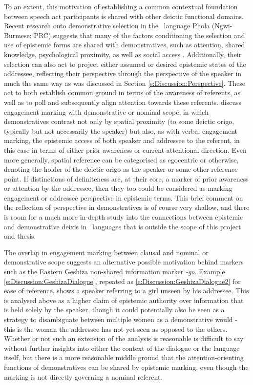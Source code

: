 To an extent, this motivation of establishing a common contextual foundation between speech act participants is shared with other deictic functional domains. Recent research onto demonstrative selection in the \lfam\ language Phola (Ngwi-Burmese: PRC) suggests that many of the factors conditioning the selection and use of epistemic forms are shared with demonstratives, such as attention, shared knowledge, psychological proximity, as well as social access \cite{GonzalezPerez2023}. Additionally, their selection can also act to project either assumed or desired epistemic states of the addressee, reflecting their perspective through the perspective of the speaker in much the same way as was discussed in Section \ref{s:Discussion:Perspective}. These act to both establish common ground in terms of the awareness of referents, as well as to poll and subsequently align attention towards these referents.  discuss engagement marking with demonstrative or nominal scope, in which demonstratives contrast not only by spatial proximity (to some deictic origo, typically but not necessarily the speaker) but also, as with verbal engagement marking, the epistemic access of both speaker and addressee to the referent, in this case in terms of either prior awareness or current attentional direction. Even more generally, spatial reference can be categorised as egocentric or otherwise, denoting the holder of the deictic origo as the speaker or some other reference point. If distinctions of definiteness are, at their core, a marker of prior awareness or attention by the addressee, then they too could be considered as marking engagement or addressee perspective in epistemic terms. This brief comment on the reflection of perspective in demonstratives is of course very shallow, and there is room for a much more in-depth study into the connections between epistemic and demonstrative deixis in \lfam\ languages that is outside the scope of this project and thesis.

The overlap in engagement marking between clausal and nominal or demonstrative scope suggests an alternative possible motivation behind markers such as the Eastern Geshiza non-shared information marker \textit{-go}. Example \ref{e:Discussion:GeshizaDialogue}, repeated as \ref{e:Discussion:GeshizaDialogue2} for ease of reference, shows a speaker referring to a girl unseen by his addressee. This is analysed above as a higher claim of epistemic authority over information that is held solely by the speaker, though it could potentially also be seen as a strategy to disambiguate between multiple women as a demonstrative would - this is the woman the addressee has not yet seen as opposed to the others. Whether or not such an extension of the analysis is reasonable is difficult to say without further insights into either the context of the dialogue or the language itself, but there is a more reasonable middle ground that the attention-orienting functions of demonstratives can be shared by epistemic marking, even though the marking is not directly governing a nominal referent.

